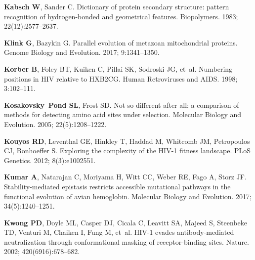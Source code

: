 \documentclass[9pt]{elife}
\begin{document}
\begin{thebibliography}{114}
\textbf{\color{eLifeMediumGrey} Kabsch W}, Sander C.
\newblock Dictionary of protein secondary structure: pattern recognition of
  hydrogen-bonded and geometrical features.
\newblock Biopolymers.  1983; 22(12):2577--2637.

\textbf{\color{eLifeMediumGrey} Klink G}, Bazykin G.
\newblock Parallel evolution of metazoan mitochondrial proteins.
\newblock Genome Biology and Evolution.  2017; 9:1341--1350.

\textbf{\color{eLifeMediumGrey} Korber B}, Foley BT, Kuiken C, Pillai SK,
  Sodroski JG, et~al.
\newblock Numbering positions in HIV relative to HXB2CG.
\newblock Human Retroviruses and AIDS.  1998; 3:102--111.

\textbf{\color{eLifeMediumGrey} Kosakovsky~Pond SL}, Frost SD.
\newblock Not so different after all: a comparison of methods for detecting
  amino acid sites under selection.
\newblock Molecular Biology and Evolution.  2005; 22(5):1208--1222.

\textbf{\color{eLifeMediumGrey} Kouyos RD}, Leventhal GE, Hinkley T, Haddad M,
  Whitcomb JM, Petropoulos CJ, Bonhoeffer S.
\newblock Exploring the complexity of the {HIV-1} fitness landscape.
\newblock PLoS Genetics.  2012; 8(3):e1002551.

\textbf{\color{eLifeMediumGrey} Kumar A}, Natarajan C, Moriyama H, Witt CC,
  Weber RE, Fago A, Storz JF.
\newblock Stability-mediated epistasis restricts accessible mutational pathways
  in the functional evolution of avian hemoglobin.
\newblock Molecular Biology and Evolution.  2017; 34(5):1240--1251.

\textbf{\color{eLifeMediumGrey} Kwong PD}, Doyle ML, Casper DJ, Cicala C,
  Leavitt SA, Majeed S, Steenbeke TD, Venturi M, Chaiken I, Fung M, et~al.
\newblock HIV-1 evades antibody-mediated neutralization through conformational
  masking of receptor-binding sites.
\newblock Nature.  2002; 420(6916):678--682.


\end{thebibliography}
\end{document}
